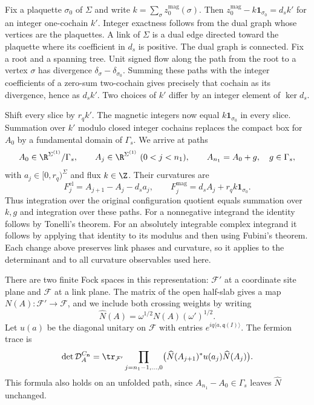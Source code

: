 Fix a plaquette $\sigma_0$ of $\Sigma$ and write
$k=\sum_\sigma z_0^{\mathrm{mag}}(\sigma)$. Then
$z_0^{\mathrm{mag}}-k\mathbf1_{\sigma_0}=d_sk'$ for an integer
one-cochain $k'$. Integer exactness follows from the dual graph whose
vertices are the plaquettes. A link of
$\Sigma$ is a dual edge directed toward the plaquette where its
coefficient in $d_s$ is positive. The dual graph is connected. Fix
a root and a spanning tree. Unit signed flow along the path from the
root to a vertex $\sigma$ has divergence
$\delta_\sigma-\delta_{\sigma_0}$. Summing these paths with the
integer coefficients of a zero-sum two-cochain gives precisely that
cochain as its divergence, hence as $d_sk'$. Two choices of $k'$
differ by an integer element of $\ker d_s$.

Shift every slice by $r_qk'$. The magnetic integers now equal
$k\mathbf1_{\sigma_0}$ in every slice. Summation over $k'$ modulo
closed integer cochains replaces the compact box for $A_0$ by a
fundamental domain of $\Gamma_s$. We arrive at paths
\[
 A_0\in\R^{\Sigma^{(1)}}/\Gamma_s,\qquad
 A_j\in\R^{\Sigma^{(1)}}\ (0<j<n_1),\qquad
 A_{n_1}=A_0+g,\quad g\in\Gamma_s,
\]
with $a_j\in[0,r_q)^{\Sigma}$ and flux $k\in\Z$. Their curvatures are
\begin{equation}\label{eq:slab-unfolded-curvatures}
 F_j^{\mathrm{el}}=A_{j+1}-A_j-d_sa_j,
 \qquad F_j^{\mathrm{mag}}=d_sA_j+r_qk\mathbf1_{\sigma_0}.
\end{equation}
Thus integration over the original configuration quotient equals
summation over $k,g$ and integration over these paths. For a
nonnegative integrand the identity follows by Tonelli's theorem. For
an absolutely integrable complex integrand it follows by applying
that identity to its modulus and then using Fubini's theorem. Each
change above preserves link phases and curvature, so it applies to
the determinant and to all curvature observables used here.

There are two finite Fock spaces in this representation: $\mathcal F'$
at a coordinate site plane and $\mathcal F$ at a link plane. The
matrix of the open half-slab gives a map
$N(A):\mathcal F'\to\mathcal F$, and we include both crossing weights
by writing
\[
 \widehat N(A)=\omega^{1/2}N(A)(\omega')^{1/2}.
\]
Let $u(a)$ be the diagonal unitary on $\mathcal F$ with entries
$e^{iq\langle a,\mathfrak q(I)\rangle}$. The fermion trace is
\begin{equation}\label{eq:slab-slice-determinant}
 \det \mathcal D_A^{C_{\mathbf n}}=
    \tr_{\mathcal F'}\prod_{j=n_1-1,\ldots,0}
             \bigl(\widehat N(A_{j+1})^*u(a_j)\widehat N(A_j)\bigr).
\end{equation}
This formula also holds on an unfolded path, since
$A_{n_1}-A_0\in\Gamma_s$ leaves $\widehat N$ unchanged.

